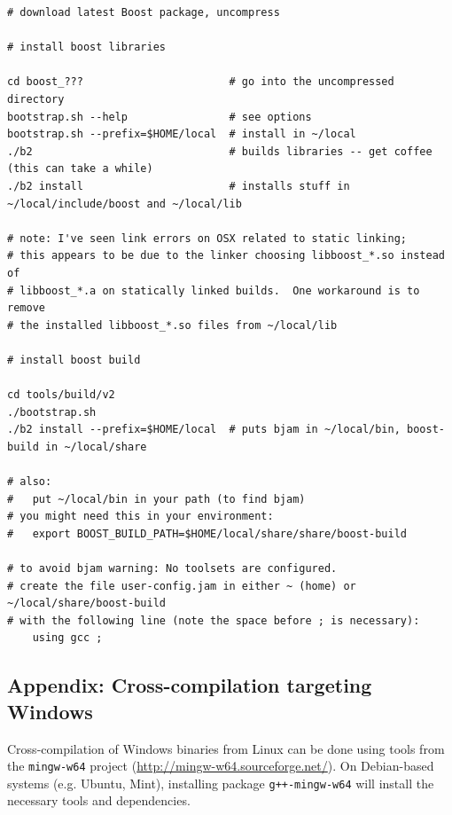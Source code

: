 \documentclass{article}
\begin{document}
\begin{footnotesize}
\begin{verbatim}
# download latest Boost package, uncompress

# install boost libraries

cd boost_???                       # go into the uncompressed directory
bootstrap.sh --help                # see options
bootstrap.sh --prefix=$HOME/local  # install in ~/local
./b2                               # builds libraries -- get coffee (this can take a while)
./b2 install                       # installs stuff in ~/local/include/boost and ~/local/lib
                    
# note: I've seen link errors on OSX related to static linking;
# this appears to be due to the linker choosing libboost_*.so instead of
# libboost_*.a on statically linked builds.  One workaround is to remove
# the installed libboost_*.so files from ~/local/lib

# install boost build

cd tools/build/v2
./bootstrap.sh
./b2 install --prefix=$HOME/local  # puts bjam in ~/local/bin, boost-build in ~/local/share

# also:
#   put ~/local/bin in your path (to find bjam)
# you might need this in your environment:
#   export BOOST_BUILD_PATH=$HOME/local/share/share/boost-build

# to avoid bjam warning: No toolsets are configured.
# create the file user-config.jam in either ~ (home) or ~/local/share/boost-build
# with the following line (note the space before ; is necessary):
    using gcc ; 

\end{verbatim}
\end{footnotesize}

\subsection{Appendix: Cross-compilation targeting Windows}

\begin{sloppypar}
Cross-compilation of Windows binaries from Linux can be done using tools from
the \texttt{mingw-w64} project (\url{http://mingw-w64.sourceforge.net/}).  On
Debian-based systems (e.g. Ubuntu, Mint), installing package
\texttt{g++-mingw-w64} will install the necessary tools and dependencies.
\end{sloppypar}
\end{document}
